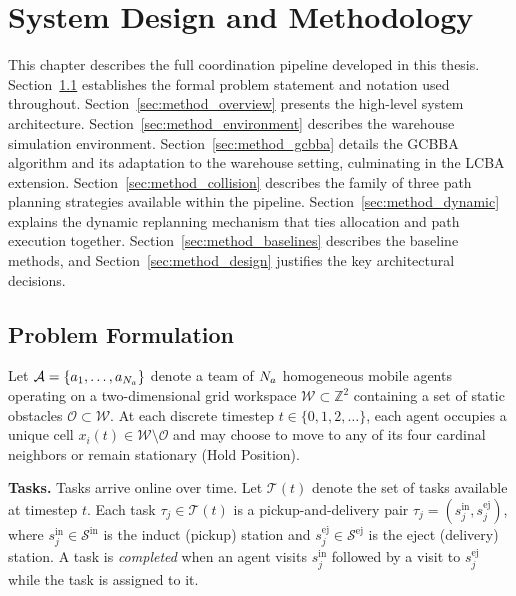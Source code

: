 \chapter{System Design and Methodology}
\label{chap:methodology}

This chapter describes the full coordination pipeline developed in this thesis.
Section~\ref{sec:method_formulation} establishes the formal problem statement
and notation used throughout.
Section~\ref{sec:method_overview} presents the high-level system architecture.
Section~\ref{sec:method_environment} describes the warehouse simulation environment.
Section~\ref{sec:method_gcbba} details the GCBBA algorithm and its adaptation
to the warehouse setting, culminating in the LCBA extension.
Section~\ref{sec:method_collision} describes the family of three path planning
strategies available within the pipeline.
Section~\ref{sec:method_dynamic} explains the dynamic replanning mechanism
that ties allocation and path execution together.
Section~\ref{sec:method_baselines} describes the baseline methods, and
Section~\ref{sec:method_design} justifies the key architectural decisions.


\section{Problem Formulation}
\label{sec:method_formulation}

Let $\mathcal{A} = \{a_1, \ldots, a_{N_a}\}$ denote a team of $N_a$ homogeneous
mobile agents operating on a two-dimensional grid workspace
$\mathcal{W} \subset \mathbb{Z}^2$ containing a set of static obstacles
$\mathcal{O} \subset \mathcal{W}$.
At each discrete timestep $t \in \{0, 1, 2, \ldots\}$, each agent occupies a
unique cell $x_i(t) \in \mathcal{W} \setminus \mathcal{O}$ and may choose to move to any
of its four cardinal neighbors or remain stationary (Hold Position).

\textbf{Tasks.}
Tasks arrive online over time.
Let $\mathcal{T}(t)$ denote the set of tasks available at timestep $t$.
Each task $\tau_j \in \mathcal{T}(t)$ is a pickup-and-delivery pair
$\tau_j = (s_j^{\text{in}}, s_j^{\text{ej}})$, where
$s_j^{\text{in}} \in \mathcal{S}^{\text{in}}$ is the induct (pickup) station and
$s_j^{\text{ej}} \in \mathcal{S}^{\text{ej}}$ is the eject (delivery) station.
A task is \emph{completed} when an agent visits $s_j^{\text{in}}$ followed by
a visit to $s_j^{\text{ej}}$ while the task is assigned to it.

